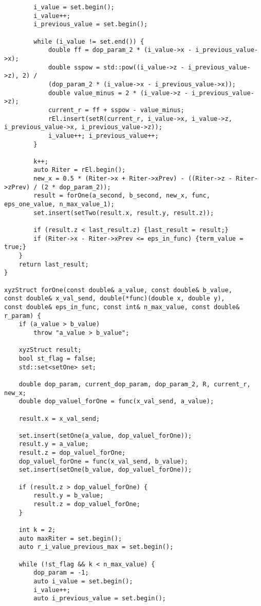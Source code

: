 \documentclass{report}
\begin{document}
\begin{lstlisting}
        i_value = set.begin();
        i_value++;
        i_previous_value = set.begin();

        while (i_value != set.end()) {
            double ff = dop_param_2 * (i_value->x - i_previous_value->x);
            double sspow = std::pow((i_value->z - i_previous_value->z), 2) /
            (dop_param_2 * (i_value->x - i_previous_value->x));
            double value_minus = 2 * (i_value->z - i_previous_value->z);
            current_r = ff + sspow - value_minus;
            rEl.insert(setR(current_r, i_value->x, i_value->z, i_previous_value->x, i_previous_value->z));
            i_value++; i_previous_value++;
        }

        k++;
        auto Riter = rEl.begin();
        new_x = 0.5 * (Riter->x + Riter->xPrev) - ((Riter->z - Riter->zPrev) / (2 * dop_param_2));
        result = forOne(a_second, b_second, new_x, func, eps_one_value, n_max_value_1);
        set.insert(setTwo(result.x, result.y, result.z));

        if (result.z < last_result.z) {last_result = result;}
        if (Riter->x - Riter->xPrev <= eps_in_func) {term_value = true;}
    }
    return last_result;
}

xyzStruct forOne(const double& a_value, const double& b_value,
const double& x_val_send, double(*func)(double x, double y),
const double& eps_in_func, const int& n_max_value, const double& r_param) {
    if (a_value > b_value)
        throw "a_value > b_value";

    xyzStruct result;
    bool st_flag = false;
    std::set<setOne> set;

    double dop_param, current_dop_param, dop_param_2, R, current_r, new_x;
    double dop_valuel_forOne = func(x_val_send, a_value);

    result.x = x_val_send;

    set.insert(setOne(a_value, dop_valuel_forOne));
    result.y = a_value;
    result.z = dop_valuel_forOne;
    dop_valuel_forOne = func(x_val_send, b_value);
    set.insert(setOne(b_value, dop_valuel_forOne));

    if (result.z > dop_valuel_forOne) {
        result.y = b_value;
        result.z = dop_valuel_forOne;
    }

    int k = 2;
    auto maxRiter = set.begin();
    auto r_i_value_previous_max = set.begin();

    while (!st_flag && k < n_max_value) {
        dop_param = -1;
        auto i_value = set.begin();
        i_value++;
        auto i_previous_value = set.begin();


\end{lstlisting}
\end{document}
